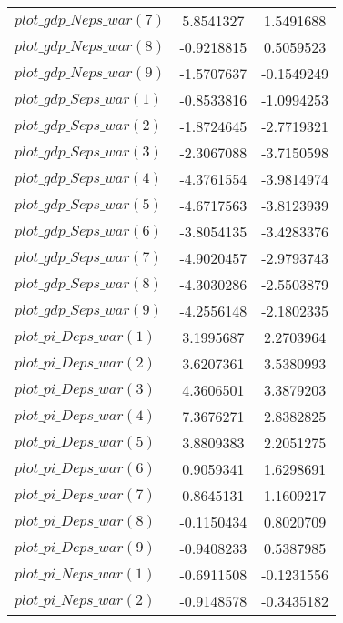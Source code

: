 \begin{center}
\begin{longtable}{lcc}
$plot\_gdp\_N eps\_war (7)  $	 & 	      5.8541327	 & 	      1.5491688 \\ 
$plot\_gdp\_N eps\_war (8)  $	 & 	     -0.9218815	 & 	      0.5059523 \\ 
$plot\_gdp\_N eps\_war (9)  $	 & 	     -1.5707637	 & 	     -0.1549249 \\ 
$plot\_gdp\_S eps\_war (1)  $	 & 	     -0.8533816	 & 	     -1.0994253 \\ 
$plot\_gdp\_S eps\_war (2)  $	 & 	     -1.8724645	 & 	     -2.7719321 \\ 
$plot\_gdp\_S eps\_war (3)  $	 & 	     -2.3067088	 & 	     -3.7150598 \\ 
$plot\_gdp\_S eps\_war (4)  $	 & 	     -4.3761554	 & 	     -3.9814974 \\ 
$plot\_gdp\_S eps\_war (5)  $	 & 	     -4.6717563	 & 	     -3.8123939 \\ 
$plot\_gdp\_S eps\_war (6)  $	 & 	     -3.8054135	 & 	     -3.4283376 \\ 
$plot\_gdp\_S eps\_war (7)  $	 & 	     -4.9020457	 & 	     -2.9793743 \\ 
$plot\_gdp\_S eps\_war (8)  $	 & 	     -4.3030286	 & 	     -2.5503879 \\ 
$plot\_gdp\_S eps\_war (9)  $	 & 	     -4.2556148	 & 	     -2.1802335 \\ 
$plot\_pi\_D eps\_war (1)   $	 & 	      3.1995687	 & 	      2.2703964 \\ 
$plot\_pi\_D eps\_war (2)   $	 & 	      3.6207361	 & 	      3.5380993 \\ 
$plot\_pi\_D eps\_war (3)   $	 & 	      4.3606501	 & 	      3.3879203 \\ 
$plot\_pi\_D eps\_war (4)   $	 & 	      7.3676271	 & 	      2.8382825 \\ 
$plot\_pi\_D eps\_war (5)   $	 & 	      3.8809383	 & 	      2.2051275 \\ 
$plot\_pi\_D eps\_war (6)   $	 & 	      0.9059341	 & 	      1.6298691 \\ 
$plot\_pi\_D eps\_war (7)   $	 & 	      0.8645131	 & 	      1.1609217 \\ 
$plot\_pi\_D eps\_war (8)   $	 & 	     -0.1150434	 & 	      0.8020709 \\ 
$plot\_pi\_D eps\_war (9)   $	 & 	     -0.9408233	 & 	      0.5387985 \\ 
$plot\_pi\_N eps\_war (1)   $	 & 	     -0.6911508	 & 	     -0.1231556 \\ 
$plot\_pi\_N eps\_war (2)   $	 & 	     -0.9148578	 & 	     -0.3435182 \\ 

\end{longtable}
\end{center}
